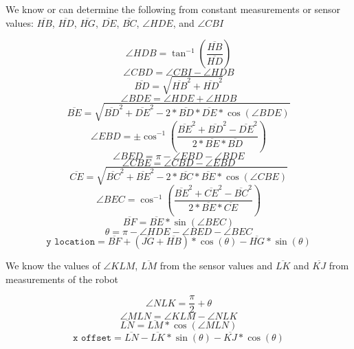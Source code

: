 We know or can determine the following from constant measurements or sensor values:
$\overline{HB}$,
$\overline{HD}$,
$\overline{HG}$,
$\overline{DE}$,
$\overline{BC}$,
$\angle HDE$, and 
$\angle CBI$

\[\angle HDB = \tan^{-1}\left(\frac{\overline{HB}}{\overline{HD}}\right)\]
\[\angle CBD = \angle CBI - \angle HDB\]
\[\overline{BD} = \sqrt{\overline{HB}^2+\overline{HD}^2}\]
\[\angle BDE = \angle HDE + \angle HDB\]
\[\overline{BE} = \sqrt{\overline{BD}^2+\overline{DE}^2-2*\overline{BD}*\overline{DE}*\cos(\angle BDE)}\]
\[\angle EBD = \pm \cos^{-1}\left(\frac{\overline{BE}^2+\overline{BD}^2-\overline{DE}^2}{2*\overline{BE}*\overline{BD}}\right)\]
\[\angle BED = \pi - \angle EBD - \angle BDE\]
\[\angle CBE = \angle CBD - \angle EBD\]
\[\overline{CE} = \sqrt{\overline{BC}^2+\overline{BE}^2-2*\overline{BC}*\overline{BE}*\cos(\angle CBE)}\]
\[\angle BEC = \cos^{-1}\left(\frac{\overline{BE}^2+\overline{CE}^2-\overline{BC}^2}{2*\overline{BE}*\overline{CE}}\right)\]
\[\overline{BF} = \overline{BE}*\sin(\angle BEC)\]
\[\theta = \pi - \angle HDE - \angle BED - \angle BEC\]
\[\texttt{y location} =  \overline{BF} + (\overline{JG} + \overline{HB})*\cos(\theta) - \overline{HG}*\sin(\theta)\]

We know the values of $\angle KLM$, $\overline{LM}$ from the sensor values and $\overline{LK}$ and $\overline{KJ}$ from measurements of the robot

\[\angle NLK = \frac{\pi}{2} + \theta\]
\[\angle MLN = \angle KLM - \angle NLK\]
\[\overline{LN} = \overline{LM}*\cos(\angle MLN)\]
\[\texttt{x offset} = \overline{LN} - \overline{LK}*\sin(\theta) - \overline{KJ}*\cos(\theta)\]